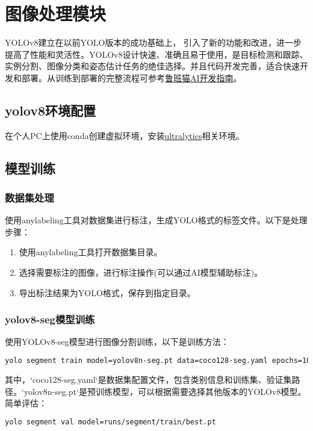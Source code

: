 \chapter{图像处理模块}
YOLOv8建立在以前YOLO版本的成功基础上， 引入了新的功能和改进，进一步提高了性能和灵活性。YOLOv8设计快速、准确且易于使用，是目标检测和跟踪、实例分割、图像分类和姿态估计任务的绝佳选择。并且代码开发完善，适合快速开发和部署。从训练到部署的完整流程可参考\href{https://doc.embedfire.com/linux/rk356x/Ai/zh/latest/lubancat_ai/example/yolov8.html}{鲁班猫AI开发指南}。
\section{yolov8环境配置}
在个人PC上使用conda创建虚拟环境，安装\href{https://github.com/ultralytics/ultralytics}{ultralytics}相关环境。
\section{模型训练}

\subsection{数据集处理}
使用anylabeling工具对数据集进行标注，生成YOLO格式的标签文件。以下是处理步骤：
\begin{enumerate}
    \item 使用anylabeling工具打开数据集目录。
    \item 选择需要标注的图像，进行标注操作(可以通过AI模型辅助标注)。
    \item 导出标注结果为YOLO格式，保存到指定目录。
\end{enumerate}
\subsection{yolov8-seg模型训练}
使用YOLOv8-seg模型进行图像分割训练，以下是训练方法：
\begin{lstlisting}[language=bash, basicstyle=\ttfamily\small, keywordstyle=\color{blue}, breaklines=true]
yolo segment train model=yolov8n-seg.pt data=coco128-seg.yaml epochs=100 imgsz=640
\end{lstlisting}
其中，`coco128-seg.yaml`是数据集配置文件，包含类别信息和训练集、验证集路径。`yolov8n-seg.pt`是预训练模型，可以根据需要选择其他版本的YOLOv8模型。
简单评估：
\begin{lstlisting}[language=bash, basicstyle=\ttfamily\small, keywordstyle=\color{blue}, breaklines=true]
yolo segment val model=runs/segment/train/best.pt
\end{lstlisting}

